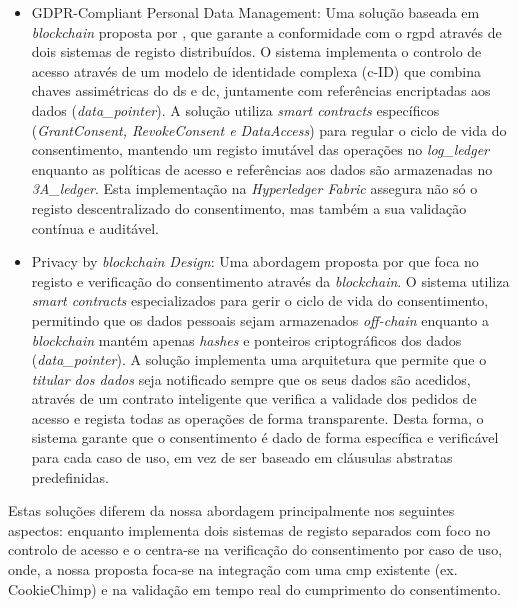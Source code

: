 \begin{itemize}
    \item GDPR-Compliant Personal Data Management: Uma solução baseada em \textit{blockchain} proposta por \citep{nguyen2020gdpr}, que garante a conformidade com o \acrshort{rgpd} através de dois sistemas de registo distribuídos. O sistema implementa o controlo de acesso através de um modelo de identidade complexa (c-ID) que combina chaves assimétricas do \acrshort{ds} e \acrshort{dc}, juntamente com referências encriptadas aos dados (\textit{data\_pointer}). A solução utiliza \textit{smart contracts} específicos (\textit{GrantConsent, RevokeConsent e DataAccess}) para regular o ciclo de vida do consentimento, mantendo um registo imutável das operações no \textit{log\_ledger} enquanto as políticas de acesso e referências aos dados são armazenadas no \textit{3A\_ledger}. Esta implementação na \textit{Hyperledger Fabric} assegura não só o registo descentralizado do consentimento, mas também a sua validação contínua e auditável.

    \item Privacy by \textit{blockchain Design}: Uma abordagem proposta por \citep{wirth2018privacy} que foca no registo e verificação do consentimento através da \textit{blockchain}. O sistema utiliza \textit{smart contracts} especializados para gerir o ciclo de vida do consentimento, permitindo que os dados pessoais sejam armazenados \textit{off-chain} enquanto a \textit{blockchain} mantém apenas \textit{hashes} e ponteiros criptográficos dos dados (\textit{data\_pointer}). A solução implementa uma arquitetura que permite que o \textit{titular dos dados} seja notificado sempre que os seus dados são acedidos, através de um contrato inteligente que verifica a validade dos pedidos de acesso e regista todas as operações de forma transparente. Desta forma, o sistema garante que o consentimento é dado de forma específica e verificável para cada caso de uso, em vez de ser baseado em cláusulas abstratas predefinidas.
\end{itemize}

Estas soluções diferem da nossa abordagem principalmente nos seguintes aspectos: enquanto \citep{nguyen2020gdpr} implementa dois sistemas de registo separados com foco no controlo de acesso e o \citep{wirth2018privacy} centra-se na verificação do consentimento por caso de uso, onde, a nossa proposta foca-se na integração com uma \acrshort{cmp} existente (ex. CookieChimp) e na validação em tempo real do cumprimento do consentimento.

